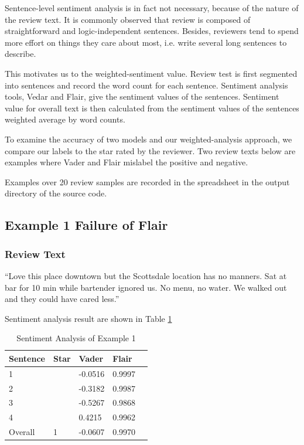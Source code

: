 \documentclass[sigconf]{acmart}
\begin{document}
Sentence-level sentiment analysis is in fact not necessary, because of the nature of the review text. It is commonly observed that review is composed of straightforward and logic-independent sentences. Besides, reviewers tend to spend more effort on things they care about most, i.e. write several long sentences to describe.

This motivates us to the weighted-sentiment value. Review test is first segmented into sentences and record the word count for each sentence. Sentiment analysis tools, Vedar and Flair, give the sentiment values of the sentences. Sentiment value for overall text is then calculated from the sentiment values of the sentences weighted average by word counts.

To examine the accuracy of two models and our weighted-analysis approach, we compare our labels to the star rated by the reviewer. Two review texts below are examples where Vader and Flair mislabel the positive and negative.

Examples over 20 review samples are recorded in the spreadsheet in the output directory of the source code.

\subsection{Example 1 Failure of Flair}
\subsubsection{Review Text}“Love this place downtown but the Scottsdale location has no manners. Sat at bar for 10 min while bartender ignored us. No menu, no water. We walked out and they could have cared less.”

Sentiment analysis result are shown in Table \ref{tab:eg1}
\begin{table}
  \caption{Sentiment Analysis of Example 1}
  \label{tab:eg1}
  \begin{tabular}{lllll}
    \toprule
    Sentence & Star & Vader & Flair \\
    \midrule
    1 & & -0.0516 & 0.9997\\
    2 & & -0.3182 & 0.9987\\
    3 & & -0.5267 & 0.9868\\
    4 & & 0.4215 & 0.9962\\
    \bottomrule
    Overall & 1 & -0.0607 & 0.9970\\
\end{tabular}
\end{table}
\end{document}
